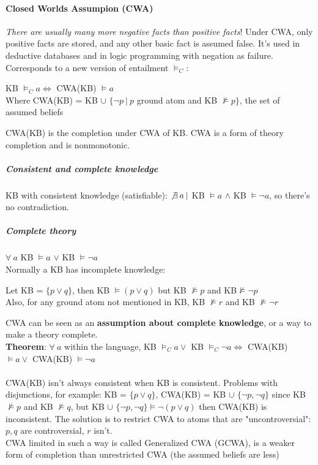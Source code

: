 \documentclass[10pt]{report}
\begin{document}
\paragraph{Closed Worlds Assumpion (CWA)} \textit{There are usually many more negative facts than positive facts}! Under CWA, only positive facts are stored, and any other basic fact is assumed false. It's used in deductive databases and in logic programming with negation as failure. Corresponds to a new version of entailment $\vDash_C$:
\begin{list}{}{}
	\item KB $\vDash_C a \Leftrightarrow$ CWA(KB) $\vDash a$\\
	Where CWA(KB) = KB $\cup$ $\{\neg p\:|\:p$ ground atom and KB $\not\vDash p\}$, the set of assumed beliefs\\
\end{list}
CWA(KB) is the completion under CWA of KB. CWA is a form of theory completion and is nonmonotonic.
\subparagraph{Consistent and complete knowledge} KB with consistent knowledge (satisfiable): $\not\exists\:a\:|$ KB $\vDash a$ $\wedge$ KB $\vDash\neg a$, so there's no contradiction.
\subparagraph{Complete theory} $\forall\:a$ KB $\vDash a$ $\vee$ KB $\vDash\neg a$\\
Normally a KB has incomplete knowledge:
\begin{list}{}{}
	\item Let KB = $\{p\vee q\}$, then KB $\vDash (p\vee q)$ but KB $\not\vDash p$ and KB$\not\vDash \neg p$\\
	Also, for any ground atom not mentioned in KB, KB $\not\vDash r$ and KB $\not\vDash \neg r$
\end{list}
CWA can be seen as an \textbf{assumption about complete knowledge}, or a way to make a theory complete.\\
\textbf{Theorem}: $\forall\:a$ within the language, KB $\vDash_C a\vee$ KB $\vDash_C\neg a \Leftrightarrow$ CWA(KB) $\vDash a\vee$ CWA(KB) $\vDash\neg a$\\\\
CWA(KB) isn't always consistent when KB is consistent. Problems with disjunctions, for example: KB = $\{p\vee q\}$, CWA(KB) = KB $\cup$ $\{\neg p, \neg q\}$ since KB $\not\vDash p$ and KB $\not\vDash q$, but KB $\cup$ $ \{\neg p, \neg q\}\vDash \neg(p\vee q)$ then CWA(KB) is inconsistent. The solution is to restrict CWA to atoms that are "uncontroversial": $p,q$ are controversial, $r$ isn't.\\
CWA limited in such a way is called Generalized CWA (GCWA), is a weaker form of completion than unrestricted CWA (the assumed beliefs are less)
\end{document}
